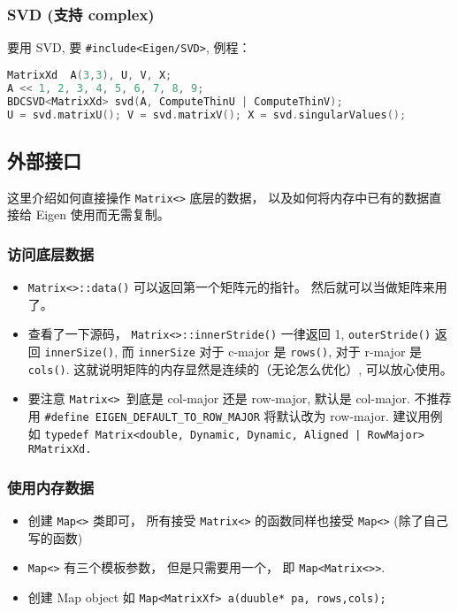 \subsubsection{SVD (支持 complex)}
要用 SVD, 要 \verb|#include<Eigen/SVD>|, 例程：
\begin{lstlisting}[language=cpp]
MatrixXd  A(3,3), U, V, X;
A << 1, 2, 3, 4, 5, 6, 7, 8, 9;
BDCSVD<MatrixXd> svd(A, ComputeThinU | ComputeThinV);
U = svd.matrixU(); V = svd.matrixV(); X = svd.singularValues();
\end{lstlisting}

\subsection{外部接口}
这里介绍如何直接操作 \verb|Matrix<>| 底层的数据， 以及如何将内存中已有的数据直接给 Eigen 使用而无需复制。

\subsubsection{访问底层数据}
\begin{itemize}
\item \verb|Matrix<>::data()| 可以返回第一个矩阵元的指针。 然后就可以当做矩阵来用了。
\item 查看了一下源码， \verb|Matrix<>::innerStride()| 一律返回 1, \verb|outerStride()| 返回 \verb|innerSize()|, 而 \verb|innerSize| 对于 c-major 是 \verb|rows()|, 对于 r-major 是 \verb|cols()|. 这就说明矩阵的内存显然是连续的（无论怎么优化）, 可以放心使用。
\item 要注意 \verb|Matrix<> |到底是 col-major 还是 row-major, 默认是 col-major. 不推荐用 \verb|#define EIGEN_DEFAULT_TO_ROW_MAJOR| 将默认改为 row-major. 建议用例如 \verb`typedef Matrix<double, Dynamic, Dynamic, Aligned | RowMajor> RMatrixXd.`
\end{itemize}

\subsubsection{使用内存数据}
\begin{itemize}
\item 创建 \verb|Map<>| 类即可， 所有接受 \verb|Matrix<>| 的函数同样也接受 \verb|Map<>| (除了自己写的函数)
\item \verb|Map<>| 有三个模板参数， 但是只需要用一个， 即 \verb|Map<Matrix<>>|.
\item 创建 Map object 如 \verb|Map<MatrixXf> a(duuble* pa, rows,cols);|
\end{itemize}

